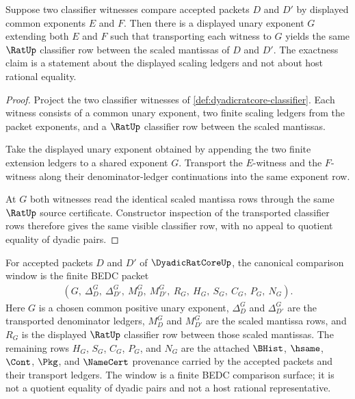\begin{theorem}
\label{thm:dyadicratcore-common-exponent-exactness}
Suppose two classifier witnesses compare accepted packets $D$ and $D'$ by
displayed common exponents $E$ and $F$. Then there is a displayed unary
exponent $G$ extending both $E$ and $F$ such that transporting each witness to
$G$ yields the same $\RatUp$ classifier row between the scaled mantissas of
$D$ and $D'$. The exactness claim is a statement about the displayed scaling
ledgers and not about host rational equality.
\end{theorem}
\begin{proof}
Project the two classifier witnesses of
\autoref{def:dyadicratcore-classifier}. Each witness consists of a common
unary exponent, two finite scaling ledgers from the packet exponents, and a
$\RatUp$ classifier row between the scaled mantissas.

Take the displayed unary exponent obtained by appending the two finite
extension ledgers to a shared exponent $G$. Transport the $E$-witness and the
$F$-witness along their denominator-ledger continuations into the same
exponent row.

At $G$ both witnesses read the identical scaled mantissa rows through the
same $\RatUp$ source certificate. Constructor inspection of the transported
classifier rows therefore gives the same visible classifier row, with no
appeal to quotient equality of dyadic pairs.
\end{proof}

\begin{definition}
\label{def:dyadicratcore-canonical-window}
For accepted packets $D$ and $D'$ of $\DyadicRatCoreUp$, the canonical
comparison window is the finite BEDC packet
$$
\begin{gathered}
  (G,\ \Delta_D^G,\ \Delta_{D'}^G,\ M_D^G,\ M_{D'}^G,\
  R_G,\ H_G,\ S_G,\ C_G,\ P_G,\ N_G).
\end{gathered}
$$
Here $G$ is a chosen common positive unary exponent, $\Delta_D^G$ and
$\Delta_{D'}^G$ are the transported denominator ledgers, $M_D^G$ and
$M_{D'}^G$ are the scaled mantissa rows, and $R_G$ is the displayed $\RatUp$
classifier row between those scaled mantissas. The remaining rows $H_G$,
$S_G$, $C_G$, $P_G$, and $N_G$ are the attached $\BHist$, $\hsame$, $\Cont$,
$\Pkg$, and $\NameCert$ provenance carried by the accepted packets and their
transport ledgers. The window is a finite BEDC comparison surface; it is not a
quotient equality of dyadic pairs and not a host rational representative.
\end{definition}

